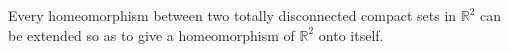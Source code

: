 Every homeomorphism between two totally disconnected compact sets in $\mathbb{R}^2$ can be extended so as to give a homeomorphism of $\mathbb{R}^2$ onto itself.
